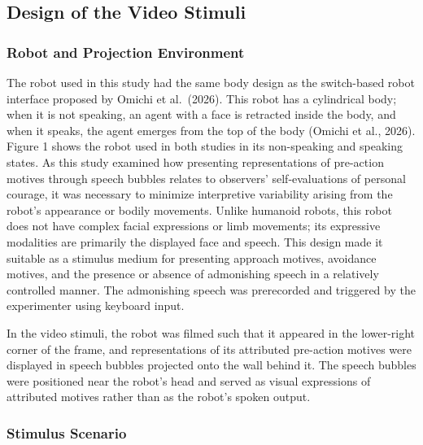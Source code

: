 \subsection{Design of the Video
Stimuli}\label{design-of-the-video-stimuli}

\subsubsection{Robot and Projection
Environment}\label{robot-and-projection-environment}

The robot used in this study had the same body design as the
switch-based robot interface proposed by Omichi et al.~(2026). This
robot has a cylindrical body; when it is not speaking, an agent with a
face is retracted inside the body, and when it speaks, the agent emerges
from the top of the body (Omichi et al., 2026). Figure 1 shows the robot
used in both studies in its non-speaking and speaking states. As this
study examined how presenting representations of pre-action motives
through speech bubbles relates to observers' self-evaluations of
personal courage, it was necessary to minimize interpretive variability
arising from the robot's appearance or bodily movements. Unlike humanoid
robots, this robot does not have complex facial expressions or limb
movements; its expressive modalities are primarily the displayed face
and speech. This design made it suitable as a stimulus medium for
presenting approach motives, avoidance motives, and the presence or
absence of admonishing speech in a relatively controlled manner. The
admonishing speech was prerecorded and triggered by the experimenter
using keyboard input.

In the video stimuli, the robot was filmed such that it appeared in the
lower-right corner of the frame, and representations of its attributed
pre-action motives were displayed in speech bubbles projected onto the
wall behind it. The speech bubbles were positioned near the robot's head
and served as visual expressions of attributed motives rather than as
the robot's spoken output.

\subsubsection{Stimulus Scenario}\label{stimulus-scenario}

